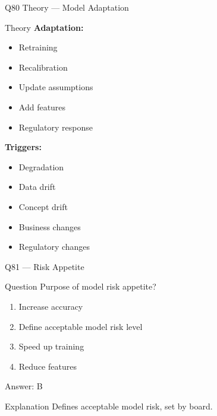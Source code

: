 \documentclass[aspectratio=169,8pt]{beamer}
\begin{document}
	\begin{frame}{Q80 Theory --- Model Adaptation}
		\begin{block}{Theory}
			\textbf{Adaptation:}
			\begin{itemize}
				\item Retraining
				\item Recalibration
				\item Update assumptions
				\item Add features
				\item Regulatory response
			\end{itemize}
			\textbf{Triggers:}
			\begin{itemize}
				\item Degradation
				\item Data drift
				\item Concept drift
				\item Business changes
				\item Regulatory changes
			\end{itemize}
		\end{block}
	\end{frame}
	
	\begin{frame}{Q81 --- Risk Appetite}
		\begin{block}{Question}
			Purpose of model risk appetite?
		\end{block}
		\begin{enumerate}[label=\Alph*.]
			\item Increase accuracy
			\item Define acceptable model risk level
			\item Speed up training
			\item Reduce features
		\end{enumerate}
		\begin{exampleblock}{Answer: B}
		\end{exampleblock}
		\begin{block}{Explanation}
			Defines acceptable model risk, set by board.
		\end{block}
	\end{frame}
	
\end{document}
